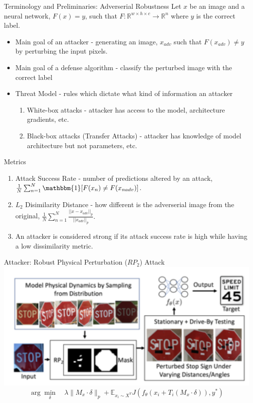 \documentclass{beamer}
\begin{document}
\begin{frame}{Terminology and Preliminaries: Adverserial Robustness}
	Let $x$ be an image and a neural network, $F(x) = y$, such that $F: \mathbb{R}^{w \times h\times c}\rightarrow \mathbb{R}^{n}$ where $y$ is the correct label.
	\begin{itemize}
		\item Main goal of an attacker - generating an image, $x_{adv}$ such that $F(x_{adv}) \neq y$ by perturbing the input pixels.
		\pause
		\item Main goal of a defense algorithm - classify the perturbed image with the correct label
		\pause
		\item Threat Model - rules which dictate what kind of information an attacker
		\begin{enumerate}
			\item White-box attacks - attacker has access to the model, architecture gradients, etc. \pause
			\item Black-box attacks (Transfer Attacks) - attacker has knowledge of model architecture but not parameters, etc.
		\end{enumerate}
	\end{itemize}
\end{frame}

\begin{frame}{Metrics}
	\begin{enumerate}
		\item Attack Success Rate - number of predictions altered by an attack, $\frac{1}{N}\sum_{n=1}^{N} \mathbbm{1}[F(x_n) \neq F(x_{nadv})]$.
		\pause
		\item $L_2$ Disimilarity Distance - how different is the adverserial image from the original, $\frac{1}{N}\sum^{N}_{n=1} \frac{||x - x_{adv}||_{p}}{||x_{adv}||_{p}}.$
		\pause
		\item An attacker is considered strong if its attack success rate is high while having a low dissimilarity metric.
	\end{enumerate}
\end{frame}

\begin{frame}{Attacker: Robust Physical Perturbation ($RP_2$) Attack}
	\centering
	\includegraphics[scale=0.55]{RP2.png}
	\pause
	\begin{equation*}
	\arg \min_\delta \quad \lambda\lVert M_x \cdot \delta \rVert_p + \mathbb{E}_{x_i \sim X^V} J(f_\theta(x_i + T_i(M_x \cdot \delta)), y^*)
	\end{equation*}
\end{frame}
\end{document}
